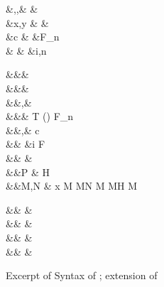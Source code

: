 \documentclass[screen,nonacm,manuscript,review]{acmart} %
\begin{document}
 \begin{figure}[ht]
 \begin{syntax}
  &\TyVar,\beta,\Co &\qquad{} &\TypeConst \\
  &x,y &\qquad{} &\NType \\
  &c &\qquad{} &F_n\\
                      &  &\qquad{} &i,n \in {}\\
 \end{syntax}
 \begin{syntax}
    &&\rho \bnfeq& \\
    &&\kappa \bnfeq& \star \bnfor \kappa \to \kappa \bnfor \shl{\sigma \sim_\rho \tau}\\
    &&\tau,\sigma \bnfeq& \TyVar \bnfor {} \bnfor
   \tau\App\tau \bnfor \Forall {\TyVar\co\kappa} \tau \bnfor \Co \\
     &&\TypeConst \bnfeq& T \bnfor (\to) \bnfor \NType \bnfor
   F_n\many\tau\\
  &&\nu,\Co \bnfeq& c \bnfor \Refl\tau \bnfor \Sym\Co \bnfor \Trans\nu\Co %
 \bnfor \Forall {\TyVar\co\kappa} \Co \bnfor \Co\At\tau %
 \bnfor \nu\App\Co \\
                  &&              &\bnfor \Left \Co \bnfor \Right \Co \bnfor \Nth i \Co \bnfor \TypeConst\App\many\Co \bnfor F\many\Co \bnfor \shl{\SubCo \Co} \\  %
  && \phi \bnfeq& \tau \bnfor \Co\\
  &&P \bnfeq& H\App \many{\beta\co\kappa} \\
  &&M,N \bnfeq& x \bnfor {} M \bnfor M\App N \bnfor \TLam{\tau\co\kappa} M \bnfor M\App\phi \bnfor H \bnfor \Case M  \bnfor \Cast \Tm \Co
 \end{syntax}
 \begin{syntax}

                     &&\roles{\TypeConst} \bnfeq& \Set{\rho \mid \alpha\co\rho, \alpha\in\Params{\TypeConst}}\\
                     && \bnfeq& \\
                     &&\Params{\NType} \bnfeq& \Set{\alpha  \mid \NType\App\many\alpha \co \star}\\
                     && \bnfeq& 
 \end{syntax}
 \caption{Excerpt of Syntax of \SFR; extension of \SFC}
 \label{fig:sfr-syntax}
 \end{figure}
\end{document}
